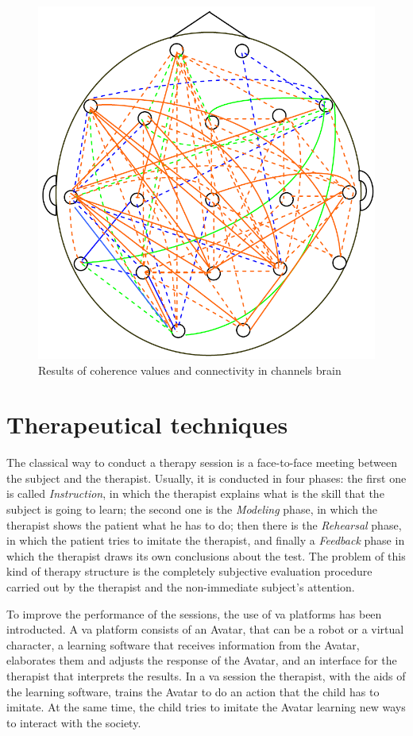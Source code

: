 \documentclass[12pt,journal,draftclsnofoot,onecolumn]{IEEEtran}
\begin{document}
\begin{figure}
\centering
\includegraphics[width = .5\textwidth]{head.png}
\caption{Results of coherence values and connectivity in channels brain}
\label{fig:head}
\end{figure}

\section{Therapeutical techniques}
\label{sec:thera_tech}

The classical way to conduct a therapy session is a face-to-face meeting between the subject and the therapist.
Usually, it is conducted in four phases: the first one is called \textit{Instruction}, in which the therapist explains what is the skill that the subject is going to learn; the second one is the \textit{Modeling} phase, in which the therapist shows the patient what he has to do; then there is the \textit{Rehearsal} phase, in which the patient tries to imitate the therapist, and finally a \textit{Feedback} phase in which the therapist draws its own conclusions about the test.
The problem of this kind of therapy structure is the completely subjective evaluation procedure carried out by the therapist and the non-immediate subject's attention.

To improve the performance of the sessions, the use of \gls{va} platforms has been introducted.
A \gls{va} platform consists of an Avatar, that can be a robot or a virtual character, a learning software that receives information from the Avatar, elaborates them and adjusts the response of the Avatar, and an interface for the therapist that interprets the results.
In a \gls{va} session the therapist, with the aids of the learning software, trains the Avatar to do an action that the child has to imitate. At the same time, the child tries to imitate the Avatar learning new ways to interact with the society.
\end{document}
